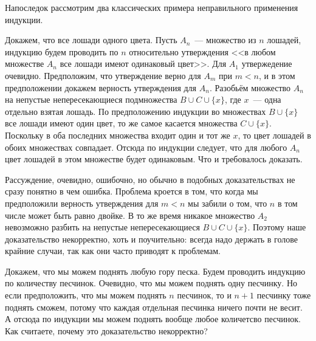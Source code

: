 Напоследок рассмотрим два классических примера неправильного применения индукции.

\begin{example}
Докажем, что все лошади одного цвета. Пусть $A_n$~--- множество из $n$ лошадей, индукцию будем проводить по $n$ относительно утверждения <<в любом множестве $A_n$ все лошади имеют одинаковый цвет>>. Для $A_1$ утвержедение очевидно. Предположим, что утверждение верно для $A_m$ при $m<n$, и в этом предположении докажем верность утверждения для $A_n$. Разобьём множество $A_n$ на непустые непересекающиеся подмножества $B\cup C \cup\{x\}$, где $x$~--- одна отдельно взятая лошадь. По предположению индукции во множествах $B\cup\{x\}$ все лошади имеют один цвет, то же самое касается множества $C\cup\{x\}$. Поскольку в оба последних множества входит один и тот же $x$, то цвет лошадей в обоих множествах совпадает. Отсюда по индукции следует, что для любого $A_n$ цвет лошадей в этом множестве будет одинаковым. Что и требовалось доказать.
\end{example}

Рассуждение, очевидно, ошибочно, но обычно в подобных доказательствах не сразу понятно в чем ошибка. Проблема кроется в том, что когда мы предположили верность утверждения для $m<n$ мы забили о том, что $n$ в том числе может быть равно двойке. В то же время никакое множество $A_2$ невозможно разбить на непустые непересекающиеся $B\cup C\cup\{x\}$. Поэтому наше доказательство некорректно, хоть и поучительно: всегда надо держать в голове крайние случаи, так как они часто приводят к проблемам.

\begin{exercise}
Докажем, что мы можем поднять любую гору песка. Будем проводить индукцию по количеству песчинок. Очевидно, что мы можем поднять одну песчинку. Но если предположить, что мы можем поднять $n$ песчинок, то и $n+1$ песчинку тоже поднять сможем, потому что каждая отдельная песчинка ничего почти не весит. А отсюда по индукции мы можем поднять вообще любое количетсво песчинок. Как считаете, почему это доказательство некорректно?
\end{exercise}
